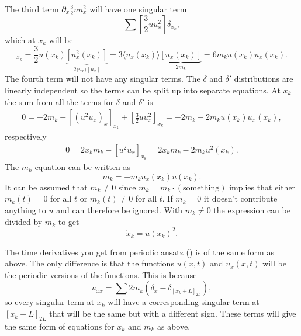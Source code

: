 \documentclass[english,master]{liumaiex}
\theoremstyle{plain}
\theoremstyle{definition}
\begin{document}
The third term $\partial_x \frac{3}{2}u u_x^2$ will have one singular term
\begin{equation}
	\sum [\frac{3}{2} u u_x^2] \delta_{x_k},
\end{equation}
which at $x_k$ will be
\begin{equation}
	[\frac{3}{2}u u_x^2]_{x_k} = \frac{3}{2}u(x_k) \underbrace{[u_x^2(x_k)]}_{2\langle u_x \rangle [u_x]} = 3 \langle u_x(x_k) \rangle \underbrace{[u_x(x_k)]}_{2m_k} = 6m_k u(x_k) u_x(x_k).
\end{equation}
%
The fourth term will not have any singular terms. The $\delta$ and $\delta'$ distributions are linearly independent so the terms can be split up into separate equations. At $x_k$ the sum from all the terms for $\delta$ and $\delta'$ is
\begin{equation}
\begin{aligned}
	0 = -2 \dot{m}_k - [(u^2u_x)_x]_{x_k} + [\frac{3}{2}uu_x^2]_{x_k} = -2 \dot{m}_k - 2 m_k u(x_k) u_x(x_k),
\end{aligned}
\end{equation}
respectively
\begin{equation}
\begin{aligned}
	0 = 2 \dot{x}_k m_k - [u^2u_x]_{x_k} = 2 \dot{x}_k m_k - 2m_ku^2(x_k).
\end{aligned}
\end{equation}
%
The $\dot{m}_k$ equation can be written as
\begin{equation}
	\dot{m}_k = -m_ku_x(x_k)u(x_k).
\end{equation}
It can be assumed that $m_k \neq 0$ since $\dot{m}_k = m_k \cdot (\text{something})$ implies that either $m_k(t) = 0$ for all $t$ or $m_k(t) \neq 0$ for all $t$. If $m_k = 0$ it doesn't contribute anything to $u$ and can therefore be ignored. With $m_k \neq 0$ the expression can be divided by $m_k$ to get
\begin{equation}
	\dot{x}_k = u(x_k)^2.
\end{equation}

The time derivatives you get from periodic ansatz () is of the same form as above. The only difference is that the functions $u(x, t)$ and $u_x(x, t)$ will be the periodic versions of the functions. This is because
\begin{equation}
	u_{xx} = \sum 2 m_k (\delta_x - \delta_{[x_k + L]_{2L}}), 
\end{equation}
so every singular term at $x_k$ will have a corresponding singular term at $[x_k + L]_{2L}$ that will be the same but with a different sign. These terms will give the same form of equations for $\dot{x}_k$ and $\dot{m}_k$ as above.
\end{document}
